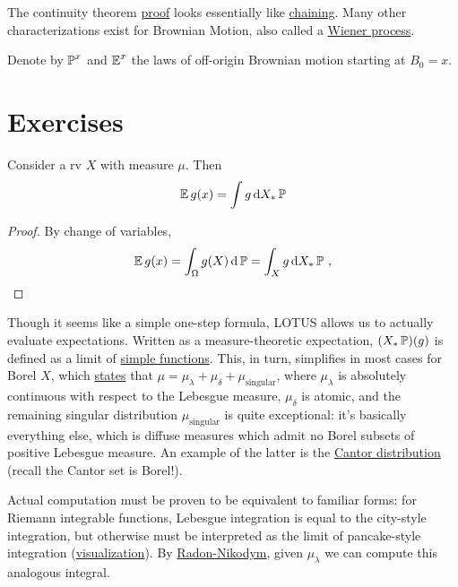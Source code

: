 \documentclass{article}
\begin{document}
The continuity theorem \href{https://almostsuremath.com/2020/10/20/the-kolmogorov-continuity-theorem/}{proof} looks essentially like \href{http://www.stat.yale.edu/~pollard/Books/Mini/Chaining.pdf}{chaining}.
Many other characterizations exist for Brownian Motion, also called a \href{https://en.wikipedia.org/wiki/Wiener_process}{Wiener process}.

\begin{definition}
  Denote by \(\P^x\) and \(\E^x\) the laws of off-origin Brownian motion starting at \(B_0=x\).
  \end{definition}


\section{Exercises}

\begin{theorem}
  Consider a rv \(X\) with measure \(\mu\). Then
  \[
    \E g(x) = \int g \d{X_*\P}
  \]
    \end{theorem}
    \begin{proof}
      By change of variables,
      \[\E g(x)=\int_\Omega g(X)\d{\P}=\int_X g\d{X_*\P}\,\,,\]
    \end{proof}

    Though it seems like a simple one-step formula, LOTUS allows us to actually evaluate expectations. Written as a measure-theoretic expectation, \((X_*\P)(g)\) is defined as a limit of \href{https://en.wikipedia.org/wiki/Simple_function}{simple functions}. This, in turn, simplifies in most cases for Borel \(X\), which
    \href{https://en.wikipedia.org/wiki/Lebesgue%27s_decomposition_theorem}{states}
      that \(\mu=\mu_{\lambda}+\mu_{\delta}+\mu_{\mathrm{singular}}\), where \(\mu_\lambda\) is absolutely continuous with respect to the Lebesgue measure, \(\mu_\delta\) is atomic, and the remaining singular distribution \(\mu_{\mathrm{singular}}\) is quite exceptional: it's basically everything else, which is diffuse measures which admit no Borel subsets of positive Lebesgue measure. An example of the latter is the \href{https://en.wikipedia.org/wiki/Cantor_distribution}{Cantor distribution} (recall the Cantor set is Borel!).

 Actual computation must be proven to be equivalent to familiar forms: for Riemann integrable functions, Lebesgue integration is equal to the city-style integration, but otherwise must be interpreted as the limit of pancake-style integration (\href{https://upload.wikimedia.org/wikipedia/commons/thumb/1/1b/RandLintegrals.png/375px-RandLintegrals.png}{visualization}). By \href{https://en.wikipedia.org/wiki/Radon%E2%80%93Nikodym_theorem}{Radon-Nikodym}, given \(\mu_\lambda\) we can compute this analogous integral.
\end{document}
